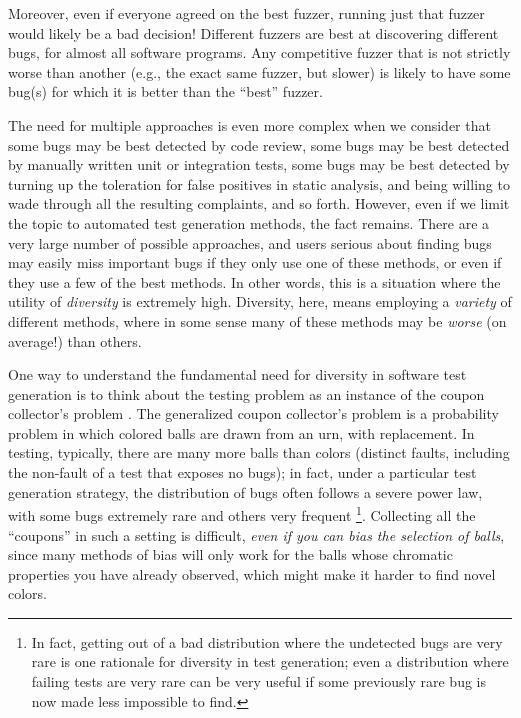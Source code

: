\documentclass[sigplan,screen]{acmart}
\begin{document}
Moreover, even if everyone agreed on the best fuzzer, running just
that fuzzer would likely be a bad decision!  Different fuzzers are
best at discovering different bugs, for almost all software programs.
Any competitive fuzzer that is not strictly worse than another (e.g.,
the exact same fuzzer, but slower) is likely to have some bug(s) for
which it is better than the ``best'' fuzzer.

The need for multiple approaches is even more complex when we consider
that some bugs may be best detected by code review, some bugs may be
best detected by manually written unit or integration tests, some bugs
may be best detected by turning up the toleration for false positives
in static analysis, and being willing to wade through all the
resulting complaints, and so forth.  However, even if we limit the
topic to automated test generation methods, the fact remains.  There
are a very large number of possible approaches, and users serious
about finding bugs may easily miss important bugs if they only use one
of these methods, or even if they use a few of the best methods.  In
other words, this is a situation where the utility of \emph{diversity}
is extremely high.  Diversity, here, means employing a \emph{variety} of different
methods, where in some sense many of these methods may be \emph{worse}
(on average!) than others.

One way to understand the fundamental need for diversity in software
test generation is to think about the testing problem as an instance
of the coupon collector's problem \cite{FormalCoupon}.  The
generalized coupon
collector's problem \cite{coupon} is a probability problem in which
colored balls are drawn from an urn, with replacement.  In testing,
typically, there are many more balls than colors (distinct faults,
including the non-fault of a test that exposes no bugs); in fact,
under a particular test generation strategy, the distribution of bugs
often follows a severe power law, with some bugs extremely rare and
others very frequent \cite{Taming}\footnote{In fact, getting out of a
  bad distribution where the undetected bugs are very rare is one
  rationale for diversity in test generation; even a distribution
  where failing tests are very rare can be very useful if some
  previously rare bug is now made less impossible to find.}.
Collecting all the ``coupons'' in such a setting is difficult, \emph{even if
you can bias the selection of balls}, since many methods of bias will
only work for the balls whose chromatic properties you have already
observed, which might make it harder to find novel colors.
\end{document}
